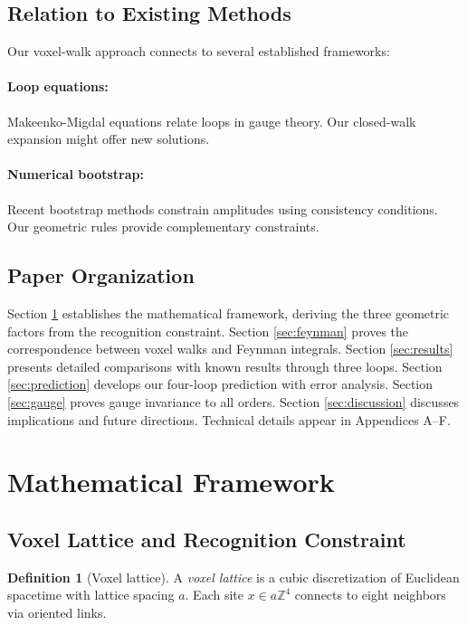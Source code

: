 \documentclass[11pt,a4paper]{article}
\theoremstyle{definition}
\newtheorem{definition}[theorem]{Definition}
\theoremstyle{remark}
\begin{document}
\subsection{Relation to Existing Methods}

Our voxel-walk approach connects to several established frameworks:

\paragraph{Loop equations:} Makeenko-Migdal equations \cite{Makeenko1979} relate loops in gauge theory. Our closed-walk expansion might offer new solutions.

\paragraph{Numerical bootstrap:} Recent bootstrap methods \cite{Paulos2016,Gopakumar2017} constrain amplitudes using consistency conditions. Our geometric rules provide complementary constraints.

\subsection{Paper Organization}

Section \ref{sec:framework} establishes the mathematical framework, deriving the three geometric factors from the recognition constraint. Section \ref{sec:feynman} proves the correspondence between voxel walks and Feynman integrals. Section \ref{sec:results} presents detailed comparisons with known results through three loops. Section \ref{sec:prediction} develops our four-loop prediction with error analysis. Section \ref{sec:gauge} proves gauge invariance to all orders. Section \ref{sec:discussion} discusses implications and future directions. Technical details appear in Appendices A–F.

\section{Mathematical Framework}
\label{sec:framework}

\subsection{Voxel Lattice and Recognition Constraint}

\begin{definition}[Voxel lattice]
A \emph{voxel lattice} is a cubic discretization of Euclidean spacetime with lattice spacing $a$. Each site $x \in a\mathbb{Z}^4$ connects to eight neighbors via oriented links.
\end{definition}
\end{document}
